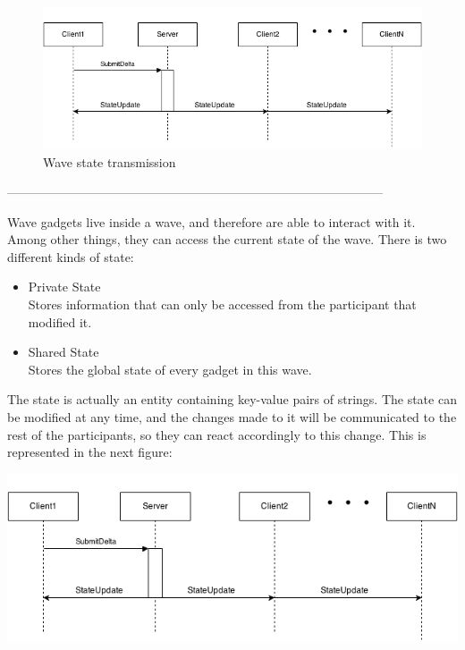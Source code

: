 \begin{figure}[h]
  \center
    \includegraphics[keepaspectratio, scale=0.6]{Media/Diagrams/Wave/StateSequence.png}
  \caption{Wave state transmission}
  \label{fig:wave_state}
\end{figure}


\begin{center}
------------------------------------------------------------------------------------------\\
\end{center}

Wave gadgets live inside a wave, and therefore are able to interact with it. Among other things, they can access the current state of the wave. There is two different kinds of state:

\begin{itemize}
  \item Private State\\
        Stores information that can only be accessed from the participant that modified it.
  \item Shared State\\
        Stores the global state of every gadget in this wave.
\end{itemize}

The state is actually an entity containing key-value pairs of strings. The state can be modified at any time, and the changes made to it will be communicated to the rest of the participants, so they can react accordingly to this change. This is represented in the next figure:


\begin{center}
\includegraphics[keepaspectratio, scale=0.6]{Media/Diagrams/Wave/StateSequence.png}
\end{center}


